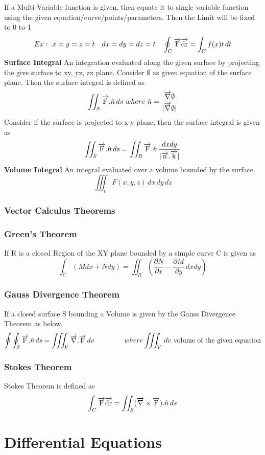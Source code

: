 If a Multi Variable function is given, then equate it to single variable function using the given equation/curve/points/parameters. Then the Limit will be fixed to 0 to 1
\[Ex:\ x=y=z=t\ \ \  dx=dy=dz=t\ \ \ \oint_C\overrightarrow{\rm F}\overrightarrow{\rm dr}=\int_Cf(x)t \,dt \]
\textbf{\large Surface Integral} An integration evaluated along the given surface by projecting the give surface to xy, yz, zx plane.
Consider \(\emptyset\) as given equation of the surface plane. Then the surface integral is defined as
\[\iint_S\overrightarrow{\rm F}.\hat{n}\,ds\ where\ \hat{n}= \frac{\overrightarrow{\rm \nabla}\emptyset}{|\overrightarrow{\rm \nabla}\emptyset|} \]
Consider if the surface is projected to x-y plane, then the surface integral is given as
\[\iint_S\overrightarrow{\rm F}.\hat{n}\,ds=\iint_R\overrightarrow{\rm F}.\hat{n}\,\frac{dxdy}{|\overrightarrow{\rm n}.\overrightarrow{\rm k}|}\]
\textbf{\large Volume Integral} An integral evaluated over a volume bounded by the surface.
\[\iiint_v F(x,y,z) \, dx\, dy\, dz\]
\subsection{Vector Calculus Theorems}
\subsection*{Green's Theorem}
If R is a closed Region of the XY plane bounded by a simple curve C is given as
\[\int_C(Mdx+Ndy)=\iint_R\left(\frac{\partial N}{\partial x}-\frac{\partial M}{\partial y} \,dxdy \right)\]

\subsection*{Gauss Divergence Theorem}
If a closed surface S bounding a Volume is given by the Gauss Divergence Theorem as below.
\[\oint\oint_S\overrightarrow{\rm F}.\hat{n}\,ds=\iiint_V\overrightarrow{\rm \nabla}.\overrightarrow{\rm F} \,dv \ \ \ \ \ \ \ \ \ \ \ \ \  where \iiint_V \,dv \ \text{volume of the given equation}\]

\subsection*{Stokes Theorem}
Stokes Theorem is defined as
\[\int_C\overrightarrow{\rm F}\overrightarrow{\rm dr}=\iint_S(\overrightarrow{\rm \nabla}\times\overrightarrow{\rm F}).\hat{n} \,ds\]


\chapter*{Differential Equations}
